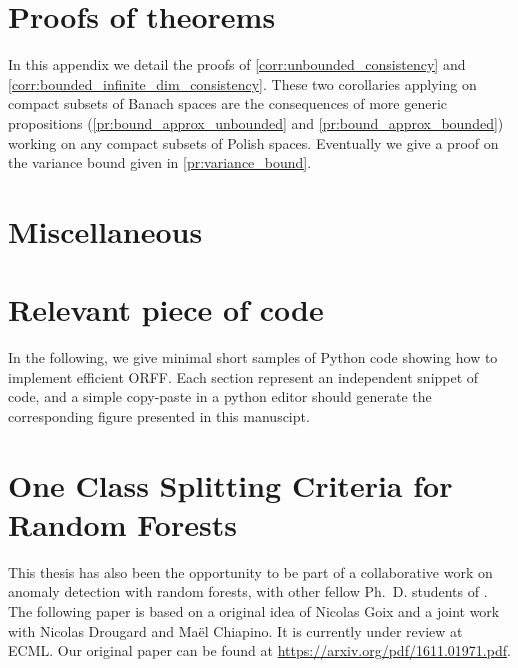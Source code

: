 
\chapter{Proofs of theorems}
\label{ch:proof_of_theorems}
\bigskip
\begin{justify}
In this appendix we detail the proofs of \cref{corr:unbounded_consistency} and
\cref{corr:bounded_infinite_dim_consistency}. These two corollaries applying on
compact subsets of Banach spaces are the consequences of more generic
propositions (\cref{pr:bound_approx_unbounded} and \cref{pr:bound_approx_bounded})
working on any compact subsets of Polish spaces. Eventually we give a proof on
the variance bound given in \cref{pr:variance_bound}.
\end{justify}
\minitoc


\chapter{Miscellaneous}
\label{ch:misc}
\bigskip
\begin{justify}
\end{justify}
\minitoc


\chapter{Relevant piece of code}
\label{ch:relevant_piece_of_code}
\bigskip
\begin{justify}
In the following, we give minimal short samples of Python code showing how to
implement efficient \acs{ORFF}. Each section represent an independent snippet
of code, and a simple copy-paste in a python editor should generate the
corresponding figure presented in this manuscipt.
\end{justify}
\minitoc


\chapter{One Class Splitting Criteria for Random Forests}
\label{ch:one_class_splitting}
\bigskip
\begin{justify}
This thesis has also been the opportunity to be part of a
collaborative work on anomaly detection with random forests, with other fellow
Ph.~D. students of \myUniTP. The following paper \citet{goix2016one} is based
on a original idea of Nicolas Goix and a joint work with Nicolas Drougard and
Ma\"el Chiapino. It is currently under review at \acs{ECML}. Our original paper
can be found at
\url{https://arxiv.org/pdf/1611.01971.pdf}.
\end{justify}
\minitoc


